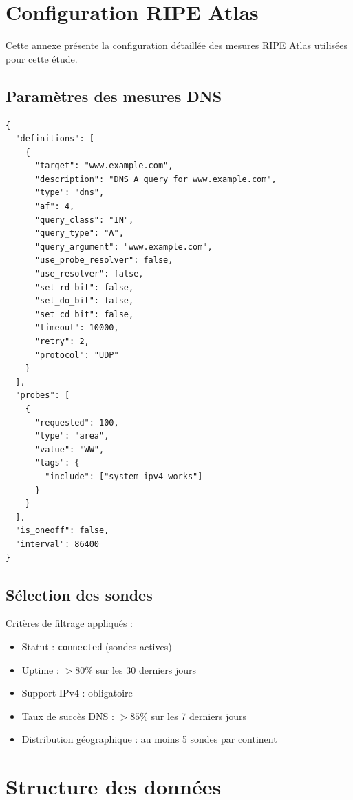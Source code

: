 \chapter{Configuration RIPE Atlas}

Cette annexe présente la configuration détaillée des mesures RIPE Atlas utilisées pour cette étude.

\section{Paramètres des mesures DNS}

\begin{lstlisting}[style=json,caption=Configuration JSON d'une mesure DNS RIPE Atlas]
{
  "definitions": [
    {
      "target": "www.example.com",
      "description": "DNS A query for www.example.com",
      "type": "dns",
      "af": 4,
      "query_class": "IN",
      "query_type": "A",
      "query_argument": "www.example.com",
      "use_probe_resolver": false,
      "use_resolver": false,
      "set_rd_bit": false,
      "set_do_bit": false,
      "set_cd_bit": false,
      "timeout": 10000,
      "retry": 2,
      "protocol": "UDP"
    }
  ],
  "probes": [
    {
      "requested": 100,
      "type": "area",
      "value": "WW",
      "tags": {
        "include": ["system-ipv4-works"]
      }
    }
  ],
  "is_oneoff": false,
  "interval": 86400
}
\end{lstlisting}

\section{Sélection des sondes}

Critères de filtrage appliqués :
\begin{itemize}
    \item Statut : \texttt{connected} (sondes actives)
    \item Uptime : $>80\%$ sur les 30 derniers jours
    \item Support IPv4 : obligatoire
    \item Taux de succès DNS : $>85\%$ sur les 7 derniers jours
    \item Distribution géographique : au moins 5 sondes par continent
\end{itemize}

\chapter{Structure des données}

